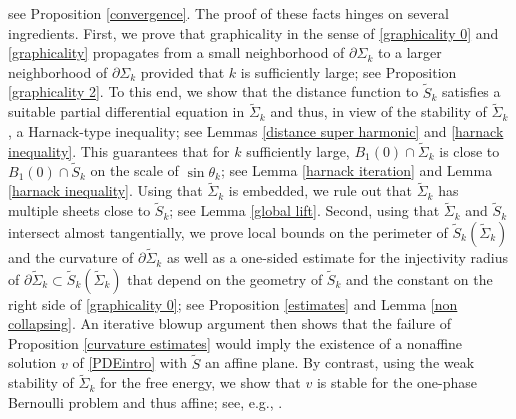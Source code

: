 \documentclass[11pt]{amsart}
\begin{document}
see Proposition \ref{convergence}. The proof of these facts hinges on several  ingredients. First, we prove that graphicality in the sense of \eqref{graphicality 0} and \eqref{graphicality} propagates from a small neighborhood of $\partial \Sigma_k$ to a larger neighborhood of $\partial \Sigma_k$ provided that $k$ is sufficiently large; see Proposition \ref{graphicality 2}. To this end, we show that the distance function to $\tilde S_k$ satisfies a suitable partial differential equation in $\tilde \Sigma_k$  and thus, in view of the stability of $\tilde \Sigma_k$, a Harnack-type inequality; see  Lemmas \ref{distance super harmonic} and \ref{harnack inequality}. This guarantees that for $k$ sufficiently large,  $B_1(0)\cap\tilde \Sigma_k$ is close to $B_1(0)\cap\tilde S_k$ on the scale of $\sin\theta_k$; see Lemma \ref{harnack iteration} and Lemma \ref{harnack inequality}. Using that $\tilde \Sigma_k$ is embedded, we rule out that $\tilde \Sigma_k$ has multiple sheets close to $\tilde S_k$; see Lemma \ref{global lift}. Second, using that $\tilde \Sigma_k$ and $\tilde S_k$ intersect almost tangentially, we prove local bounds on the perimeter of $\tilde S_k(\tilde \Sigma_k)$ and the curvature of $\partial \tilde \Sigma_k$ as well as a one-sided estimate for the injectivity radius of $\partial \tilde \Sigma_k\subset \tilde S_k(\tilde \Sigma_k)$ that depend on the geometry of $\tilde S_k$ and the constant on the right side of \eqref{graphicality 0}; see Proposition \ref{estimates} and Lemma \ref{non collapsing}. An iterative blowup argument then shows that the failure of Proposition \ref{curvature estimates} would imply the existence of a nonaffine solution $v$  of \eqref{PDEintro} with $\tilde S$ an affine plane. By contrast, using the weak stability of $\tilde \Sigma_k$ for the free energy, we show that $v$ is stable for the one-phase Bernoulli problem and thus affine;  see, e.g., \cite{KamburovWang}.
\end{document}
